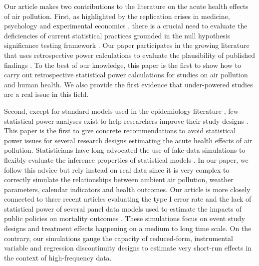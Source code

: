 \documentclass[12pt]{article}
\begin{document}
    Our article makes two contributions to the literature on the acute health effects of air pollution. First, as highlighted by the replication crises in medicine, psychology and experimental economics \citep{button2013power, open2015estimating, camerer2018evaluating}, there is a crucial need to evaluate the deficiencies of current statistical practices grounded in the null hypothesis significance testing framework \citep{ziliak2008cult, simonsohn2014p, smaldino2016natural, greenland2017invited, christensen2019transparent, amrhein2019statistical}. Our paper participates in the growing literature that uses retrospective power calculations to evaluate the plausibility of published findings \citep{ioannidis_why_2008, gelman_beyond_2014, smaldino2016natural, ioannidis_power_2017, ferraro_featureis_2020, stommes2021reliability}. To the best of our knowledge, this paper is the first to show how to carry out retrospective statistical power calculations for studies on air pollution and human health. We also provide the first evidence that under-powered studies are a real issue in this field.
    
    Second, except for standard models used in the epidemiology literature \citep{winquist2012power}, few statistical power analyses exist to help researchers improve their study designs \citep{bhaskaran2013time}. This paper is the first to give concrete recommendations to avoid statistical power issues for several research designs estimating the acute health effects of air pollution. Statisticians have long advocated the use of fake-data simulations to flexibly evaluate the inference properties of statistical models \citep{gelman_beyond_2014, vasishth2019embrace, altoe_enhancing_2020, gelman2020regression}. In our paper, we follow this advice but rely instead on real data since it is very complex to correctly simulate the relationships between ambient air pollution, weather parameters, calendar indicators and health outcomes. Our article is more closely connected to three recent articles evaluating the type I error rate and the lack of statistical power of several panel data models used to estimate the impacts of public policies on mortality outcomes \citep{schell2018evaluating, black2019simulated, griffin2020variation}. These simulations focus on event study designs and treatment effects happening on a medium to long time scale. On the contrary, our simulations gauge the capacity of reduced-form, instrumental variable and regression discontinuity designs to estimate very short-run effects in the context of high-frequency data.
    
\end{document}
